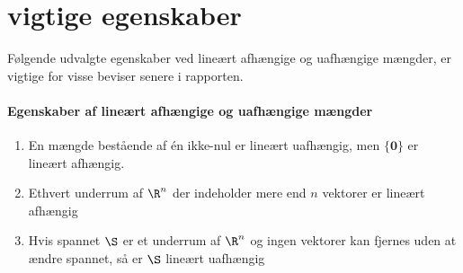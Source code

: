 \chapter{vigtige egenskaber}

Følgende udvalgte egenskaber ved lineært afhængige og uafhængige mængder, er vigtige for visse beviser senere i rapporten.
\subsubsection{Egenskaber af lineært afhængige og uafhængige mængder}\label{egenskab_lin}
\begin{enumerate}
\item En mængde bestående af én ikke-nul er lineært uafhængig, men $\{\textbf{0}\}$ er lineært afhængig.
\item Ethvert underrum af $\R^n$ der indeholder mere end $n$ vektorer er lineært afhængig
\item Hvis spannet $\S$ er et underrum af $\R^n$ og ingen vektorer kan fjernes uden at ændre spannet, så er $\S$ lineært uafhængig

\end{enumerate}
